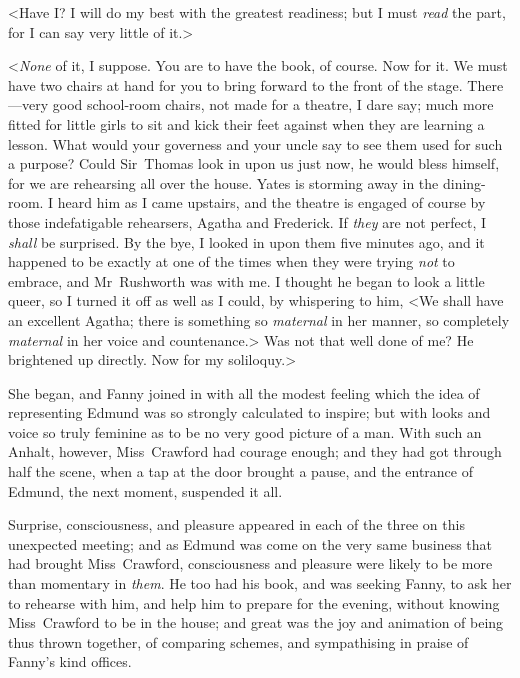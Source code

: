 <Have I? I will do my best with the greatest readiness; but I must \textit{read}  the part, for I can say very little of it.>

<\textit{None}  of it, I suppose. You are to have the book, of course. Now for it. We must have two chairs at hand for you to bring forward to the front of the stage. There—very good school-room chairs, not made for a theatre, I dare say; much more fitted for little girls to sit and kick their feet against when they are learning a lesson. What would your governess and your uncle say to see them used for such a purpose? Could Sir~Thomas look in upon us just now, he would bless himself, for we are rehearsing all over the house. Yates is storming away in the dining-room. I heard him as I came upstairs, and the theatre is engaged of course by those indefatigable rehearsers, Agatha and Frederick. If \textit{they}  are not perfect, I \textit{shall}  be surprised. By the bye, I looked in upon them five minutes ago, and it happened to be exactly at one of the times when they were trying \textit{not}  to embrace, and Mr~Rushworth was with me. I thought he began to look a little queer, so I turned it off as well as I could, by whispering to him, <We shall have an excellent Agatha; there is something so \textit{maternal}  in her manner, so completely \textit{maternal}  in her voice and countenance.> Was not that well done of me? He brightened up directly. Now for my soliloquy.>

She began, and Fanny joined in with all the modest feeling which the idea of representing Edmund was so strongly calculated to inspire; but with looks and voice so truly feminine as to be no very good picture of a man. With such an Anhalt, however, Miss~Crawford had courage enough; and they had got through half the scene, when a tap at the door brought a pause, and the entrance of Edmund, the next moment, suspended it all.

Surprise, consciousness, and pleasure appeared in each of the three on this unexpected meeting; and as Edmund was come on the very same business that had brought Miss~Crawford, consciousness and pleasure were likely to be more than momentary in \textit{them}. He too had his book, and was seeking Fanny, to ask her to rehearse with him, and help him to prepare for the evening, without knowing Miss~Crawford to be in the house; and great was the joy and animation of being thus thrown together, of comparing schemes, and sympathising in praise of Fanny's kind offices.

